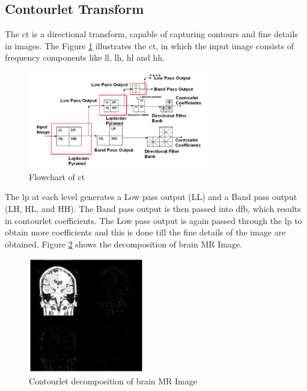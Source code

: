 \subsection{Contourlet Transform}

The \gls{ct} is a directional transform, capable of capturing contours and fine details in images. The Figure \ref{fig:contourlet_2} illustrates the \gls{ct}, in which the input image consists of frequency components like \gls{ll}, \gls{lh}, \gls{hl} and \gls{hh}. 

\begin{figure}[h]
	\centering
	\includegraphics[width=0.7\textwidth]{fig/contourlet_2}
	\caption{Flowchart of \glsdesc{ct}}
	\label{fig:contourlet_2}
\end{figure}

The \gls{lp} at each level generates a Low pass output (LL) and a Band pass output (LH, HL, and HH). The Band pass output is then passed into \gls{dfb}, which
results in contourlet coefficients. The Low pass output is again passed through the \gls{lp} to obtain more coefficients and this is done till the fine details of the image are obtained. Figure \ref{fig:contourlet_mr} shows the decomposition of brain MR Image. 

\begin{figure}[h]
	\centering
	\includegraphics[width=0.45\textwidth]{fig/contourlet_mr}
	\caption{Contourlet decomposition of brain MR Image}
	\label{fig:contourlet_mr}
\end{figure}



